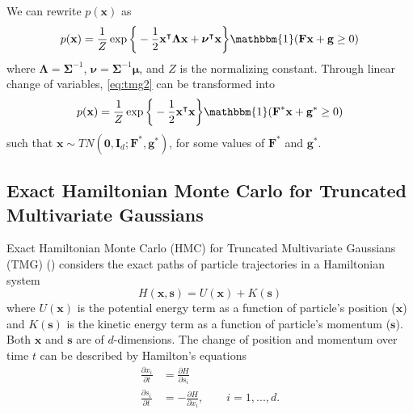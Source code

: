 \documentclass{scrartcl}
\numberwithin{equation}{section}
\begin{document}
We can rewrite $p(\boldsymbol{\textbf{x}})$ as
\begin{equation}\label{eq:tmg2}
	p(\textbf{x}) = \frac1Z\exp\bigg\{-\frac{1}{2}\textbf{x}^{\intercal} \boldsymbol{\Lambda} \textbf{x} + \boldsymbol{\nu}^{\intercal}\textbf{x}\bigg\}\mathbbm{1}(\textbf{F}\textbf{x} + \textbf{g} \geq 0)
\end{equation}
where $\boldsymbol{\Lambda} = \boldsymbol{\Sigma}^{-1}$, $\boldsymbol{\nu} = \boldsymbol{\Sigma}^{-1}\boldsymbol{\mu}$, and $Z$ is the normalizing constant. Through linear change of variables, \eqref{eq:tmg2} can be transformed into
\begin{equation}\label{eq:tmg3}
	p(\textbf{x}) = \frac1Z\exp\bigg\{-\frac{1}{2}\textbf{x}^{\intercal}\textbf{x}\bigg\}\mathbbm{1}(\textbf{F}^*\textbf{x} + \textbf{g}^* \geq 0)
\end{equation}
such that $\textbf{x} \sim TN(\textbf{0}, \textbf{I}_d;\textbf{F}^*,\textbf{g}^*)$, for some values of $\textbf{F}^*$ and $\textbf{g}^*$.

\subsection{Exact Hamiltonian Monte Carlo for Truncated Multivariate Gaussians}   
Exact Hamiltonian Monte Carlo (HMC) for Truncated Multivariate Gaussians (TMG) (\cite{pakman2013exact}) considers the exact paths of particle trajectories in a Hamiltonian system
\begin{equation}\label{eq:hml}
	H(\textbf{x}, \textbf{s}) = U(\textbf{x}) + K(\textbf{s})
\end{equation}
where $U(\textbf{x})$ is the potential energy term as a function of particle's position ($\textbf{x}$) and $K(\textbf{s})$ is the kinetic energy term as a function of particle's momentum ($\textbf{s}$). Both $\textbf{x}$ and $\textbf{s}$ are of $d$-dimensions.   
The change of position and momentum over time $t$ can be described by Hamilton's equations
\begin{equation}\label{eq:heqs}
\begin{split}
	\frac{\partial x_i}{\partial t} & = \frac{\partial H}{\partial s_i} \\
	\frac{\partial s_i}{\partial t} & = -\frac{\partial H}{\partial x_i}, \qquad i=1,...,d.\\
\end{split}
\end{equation}
\end{document}

